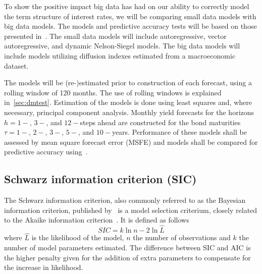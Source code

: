 To show the positive impact big data has had on our ability to correctly model the term structure of interest rates, we will be comparing small data models with big data models. The models and predictive accuracy tests will be based on those presented in~\textcite{Swanson2017}. The small data models will include autoregressive, vector autoregressive, and dynamic Nelson-Siegel models. The big data models will include models utilizing diffusion indexes estimated from a macroeconomic dataset. 

The models will be (re-)estimated prior to construction of each forecast, using a rolling window of 120 months. The use of rolling windows is explained in~\cref{sec:dmtest}. Estimation of the models is done using least squares and, where necessary, principal component analysis. Monthly yield forecasts for the horizons $h = 1-$, $3-$, and $12-$steps ahead are constructed for the bond maturities $\tau = 1-$, $2-$, $3-$, $5-$, and $10-$years. Performance of these models shall be assessed by mean square forecast error (MSFE) and models shall be compared for predictive accuracy using~\textcite[hereafter DM]{Diebold1994}. 

\subsection{Schwarz information criterion (SIC)}
\label{sec:sic}
The Schwarz information criterion, also commonly referred to as the Bayesian information criterion, published by~\textcite[hereafter SIC]{Schwarz1978} is a model selection criterium, closely related to the Akaike information criterion~\parencite{Akaike1974}. It is defined as follows
\begin{equation}
	SIC = k\ln{n} - 2\ln{\hat{L}}
\end{equation}
where $\hat{L}$ is the likelihood of the model, $n$ the number of observations and $k$ the number of model parameters estimated. The difference between SIC and AIC is the higher penalty given for the addition of extra parameters to compensate for the increase in likelihood.

